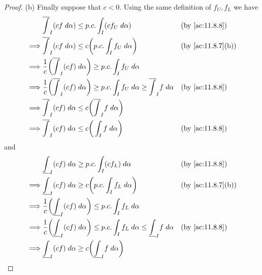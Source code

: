\begin{proof}{(b)}
  Finally suppose that \(c < 0\).
  Using the same definition of \(f_U, f_L\) we have
  \begin{align*}
             & \overline{\int}_I (cf \; d \alpha) \leq p.c. \int_I (c f_U \; d \alpha)                                                           &  & \text{(by \cref{ac:11.8.8})}    \\
    \implies & \overline{\int}_I (cf \; d \alpha) \leq c \bigg(p.c. \int_I f_U \; d \alpha\bigg)                                                 &  & \text{(by \cref{ac:11.8.7}(b))} \\
    \implies & \dfrac{1}{c} \bigg(\overline{\int}_I (cf) \; d \alpha\bigg) \geq p.c. \int_I f_U \; d \alpha                                                                           \\
    \implies & \dfrac{1}{c} \bigg(\overline{\int}_I (cf) \; d \alpha\bigg) \geq p.c. \int_I f_U \; d \alpha \geq \overline{\int}_I f \; d \alpha &  & \text{(by \cref{ac:11.8.8})}    \\
    \implies & \overline{\int}_I (cf) \; d \alpha \leq c\bigg(\overline{\int}_I f \; d \alpha\bigg)                                                                                   \\
    \implies & \overline{\int}_I (cf) \; d \alpha \leq c\bigg(\int_I f \; d \alpha\bigg)                                                         &  & \text{(by \cref{ac:11.8.8})}
  \end{align*}
  and
  \begin{align*}
             & \underline{\int}_I (cf) \; d \alpha \geq p.c. \int_I (c f_L) \; d \alpha                                                            &  & \text{(by \cref{ac:11.8.8})}    \\
    \implies & \underline{\int}_I (cf) \; d \alpha \geq c \bigg(p.c. \int_I f_L \; d \alpha\bigg)                                                  &  & \text{(by \cref{ac:11.8.7}(b))} \\
    \implies & \dfrac{1}{c} \bigg(\underline{\int}_I (cf) \; d \alpha\bigg) \leq p.c. \int_I f_L \; d \alpha                                                                            \\
    \implies & \dfrac{1}{c} \bigg(\underline{\int}_I (cf) \; d \alpha\bigg) \leq p.c. \int_I f_L \; d \alpha \leq \underline{\int}_I f \; d \alpha &  & \text{(by \cref{ac:11.8.8})}    \\
    \implies & \underline{\int}_I (cf) \; d \alpha \geq c\bigg(\underline{\int}_I f \; d \alpha\bigg)                                                                                   \\

\end{align*}
\end{proof}
